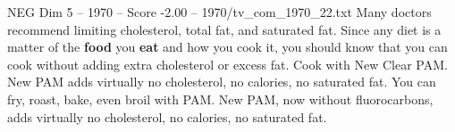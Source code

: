 \begin{textsample}{NEG Dim 5 – 1970 – Score -2.00 – 1970/tv\_com\_1970\_22.txt}  \label{ex:f5_neg_055}
Many doctors recommend limiting cholesterol, total fat, and saturated fat.
Since any diet is a matter of the \textbf{food} you \textbf{eat} and how you cook it, you should know that you can cook without adding extra cholesterol or excess fat.
Cook with New Clear PAM.
New PAM adds virtually no cholesterol, no calories, no saturated fat.
You can fry, roast, bake, even broil with PAM.
New PAM, now without fluorocarbons, adds virtually no cholesterol, no calories, no saturated fat.

\end{textsample}
